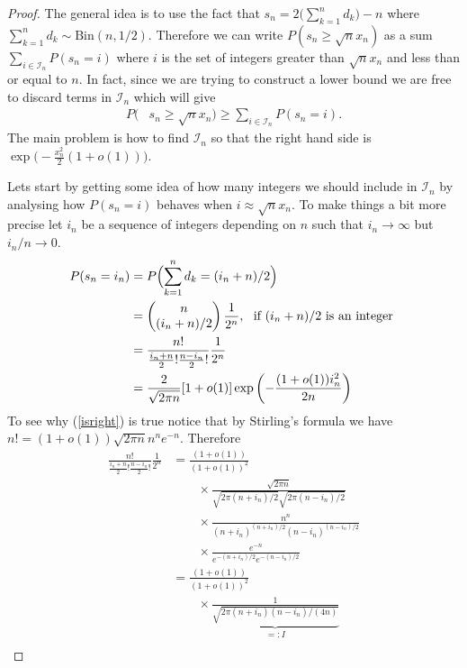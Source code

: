 \begin{proof}
The general idea is to use the fact that $s_n=2\bigl(\sum_{k=1}^n d_k\bigr) -n$ where $\sum_{k=1}^n d_k\sim \text{Bin}(n,1/2)$.
Therefore we can write $P(s_n\geq \sqrt{n} x_n)$ as a sum $\sum_{i\in \mathcal I_n}P(s_n = i)$ where $i$ is the set of integers greater than $\sqrt{n} x_n$ and less than or equal to $n$. In fact, since we are trying to construct a lower bound we are free to discard terms in  $\mathcal  I_n$ which will give
\begin{align*}
P(&s_n\geq \sqrt{n} x_n) \geq \sum_{i\in\mathcal I_n} P(s_n = i).
\end{align*}
The main problem is how to find  $\mathcal I_n$ so that the right hand side is $\exp\bigl( -\frac{x_n^2}{2} (1+o(1))\bigr)$.

Lets start by getting some idea of how many integers we should include in  $\mathcal I_n$ by analysing how $P(s_n = i)$ behaves when $i\approx \sqrt{n}x_n
$. To make things a bit more precise let $i_n$ be a sequence of integers depending on $n$ such that $i_n\rightarrow \infty$ but $i_n/n \rightarrow 0$.
\begin{align}
P(s_n = i_n)
&=P\Bigl(\sum_{k=1}^n d_k = (i_n +n)/2\Bigr)\nonumber\\
&=\begin{pmatrix} n \\ (i_n +n)/2 \end{pmatrix} \frac{1}{2^n},\,\,\text{ if $(i_n +n)/2$ is an integer }\nonumber\\
&=\frac{n!}{\frac{i_n +n}{2}! \frac{n -i_n}{2}! } \frac{1}{2^n}\nonumber\\
& = \frac{2}{\sqrt{2\pi n}} [1+o(1)] \exp\left( - \frac{(1+o(1)) i_n^2}{2n} \right)\label{isright}
\end{align}
To see why (\ref{isright}) is true notice that by Stirling's formula we have $n! = (1+o(1)) \sqrt{2\pi n} n^n e^{-n}$. Therefore
\begin{align*}
\frac{n!}{\frac{i_n +n}{2}! \frac{n -i_n}{2}! }  \frac{1}{2^n}
&= \frac{(1+o(1))}{(1+o(1))^2} \\
&\qquad\times \frac{\sqrt{2\pi n} }{\sqrt{2\pi (n+i_n)/2}\sqrt{2\pi (n-i_n)/2}  } \\
&\qquad\times\frac{n^n}{ (n+i_n)^{(n+i_n)/2}(n-i_n)^{(n-i_n)/2}} \\
&\qquad\times \frac{ e^{-n}}{ e^{-(n+i_n)/2} e^{-(n-i_n)/2}  } \\
&= \frac{(1+o(1))}{(1+o(1))^2} \\
&\qquad\times \underbrace{\frac{1 }{\sqrt{2\pi (n+i_n) (n-i_n)/(4n)}  }}_{=:I}\\

\end{align*}
\end{proof}
